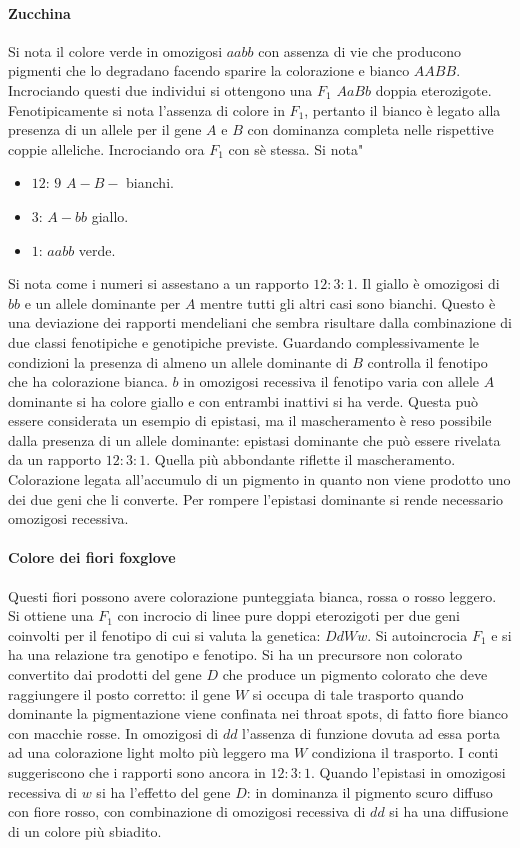 \paragraph{Zucchina}
Si nota il colore verde in omozigosi $aabb$ con assenza di vie che producono pigmenti che lo degradano facendo sparire la colorazione e bianco $AABB$. Incrociando questi due individui
si ottengono una $F_1$ $AaBb$ doppia eterozigote. Fenotipicamente si nota l'assenza di colore in $F_1$, pertanto il bianco \`e legato alla presenza di un allele per il gene $A$ e $B$ 
con dominanza completa nelle rispettive coppie alleliche. Incrociando ora $F_1$ con s\`e stessa. Si nota"
\begin{itemize}
	\item $12$: $9$ $A-B-$ bianchi.
	\item $3$: $A-bb$ giallo.
	\item $1$: $aabb$ verde.
\end{itemize}
Si nota come i numeri si assestano a un rapporto $12:3:1$. Il giallo \`e omozigosi di $bb$ e un allele dominante per $A$ mentre tutti gli altri casi sono bianchi. Questo \`e una
deviazione dei rapporti mendeliani che sembra risultare dalla combinazione di due classi fenotipiche e genotipiche previste. Guardando complessivamente le condizioni la presenza
di almeno un allele dominante di $B$ controlla il fenotipo che ha colorazione bianca. $b$ in omozigosi recessiva il fenotipo varia con allele $A$ dominante si ha colore giallo e con
entrambi inattivi si ha verde. Questa pu\`o essere considerata un esempio di epistasi, ma il mascheramento \`e reso possibile dalla presenza di un allele dominante: epistasi dominante
che pu\`o essere rivelata da un rapporto $12:3:1$. Quella pi\`u abbondante riflette il mascheramento. Colorazione legata all'accumulo di un pigmento in quanto non viene prodotto uno
dei due geni che li converte. Per rompere l'epistasi dominante si rende necessario omozigosi recessiva. 
\paragraph{Colore dei fiori foxglove}
Questi fiori possono avere colorazione punteggiata bianca, rossa o rosso leggero. Si ottiene una $F_1$ con incrocio di linee pure doppi eterozigoti per due geni coinvolti per il 
fenotipo di cui si valuta la genetica: $DdWw$. Si autoincrocia $F_1$ e si ha una relazione tra genotipo e fenotipo. Si ha un precursore non colorato convertito dai prodotti del gene 
$D$ che produce un pigmento colorato che deve raggiungere il posto corretto: il gene $W$ si occupa di tale trasporto quando dominante la pigmentazione viene confinata nei throat 
spots, di fatto fiore bianco con macchie rosse. In omozigosi di $dd$ l'assenza di funzione dovuta ad essa porta ad una colorazione light molto pi\`u leggero ma $W$ condiziona il 
trasporto. I conti suggeriscono che i rapporti sono ancora in $12:3:1$. Quando l'epistasi in omozigosi recessiva di $w$ si ha l'effetto del gene $D$: in dominanza il pigmento scuro
diffuso con fiore rosso, con combinazione di omozigosi recessiva di $dd$ si ha una diffusione di un colore pi\`u sbiadito. 
